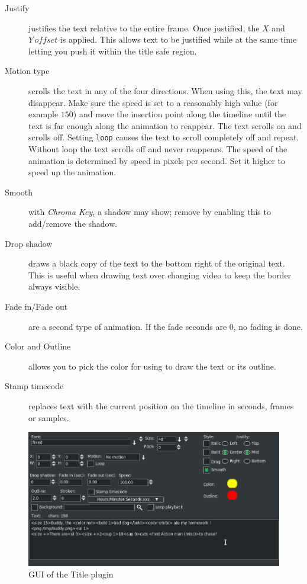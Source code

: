 {\begin{description}
    \item[Justify] justifies the text relative to the entire frame. Once justified, the $X$ and $Y\, offset$ is applied. This allows text to be justified while at the same time letting you push it within the title safe region.
    \item[Motion type] scrolls the text in any of the four directions. When using this, the text may disappear. Make sure the speed is set to a reasonably high value (for example $150$) and move the insertion point along the timeline until the text is far enough along the animation to reappear. The text scrolls on and scrolls off. Setting \texttt{loop} causes the text to scroll completely off and repeat. Without loop the text scrolls off and never reappears. The speed of the animation is determined by speed in pixels per second. Set it higher to speed up the animation.
    \item[Smooth] with \textit{Chroma Key}, a shadow may show; remove by enabling this to add/remove the shadow.
    \item[Drop shadow] draws a black copy of the text to the bottom right of the original text. This is useful when drawing text over changing video to keep the border always visible.
    \item[Fade in/Fade out] are a second type of animation. If the fade seconds are $0$, no fading is done.
    \item[Color and Outline] allows you to pick the color for using to draw the text or its outline.
    \item[Stamp timecode] replaces text with the current position on the timeline in seconds, frames or samples.
\end{description}

\begin{figure}[hbtp]
    \centering
    \includegraphics[width=0.9\linewidth]{images/title01.png}
    \caption{GUI of the Title plugin}
    \label{fig:title01}
\end{figure}

}
